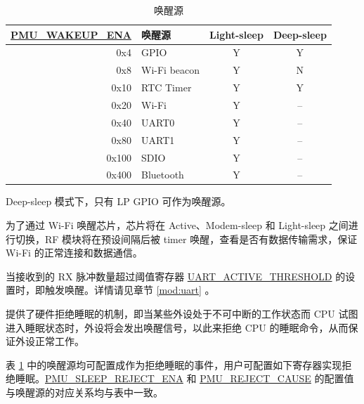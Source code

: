 \documentclass[main\_\_CN.tex]{subfiles}
\begin{document}
\begin{table}[H]
    \centering
    \caption{唤醒源}
    \label{tab:lowpowm-wakeup-source}
    \begin{threeparttable}
    \begin{tabular}{| r | l | c | c |}
    \hline
    \rowcolor{lightgray}
    \textbf{\hyperref[fielddesc:PMUWAKEUPENA]{PMU\_WAKEUP\_ENA}} & \textbf{唤醒源} &  \textbf{Light-sleep} & \textbf{Deep-sleep}  \\\hline
    0x4 & GPIO\tnote{1} & Y & Y \\\hline
    0x8 & Wi-Fi beacon  & Y & N \\\hline
    0x10 & RTC Timer  & Y & Y \\\hline
    0x20 & Wi-Fi\tnote{2} & Y & – \\\hline
    0x40 & UART0\tnote{3} & Y & – \\\hline
    0x80 & UART1\tnote{3} & Y & – \\\hline
    0x100 & SDIO & Y & – \\\hline
    0x400 & Bluetooth & Y & – \\\hline
    \end{tabular}
\begin{tablenotes}
    \item[1] Deep-sleep 模式下，只有 LP GPIO 可作为唤醒源。

    \item[2] 为了通过 Wi-Fi 唤醒芯片，芯片将在 Active、Modem-sleep 和 Light-sleep 之间进行切换，RF 模块将在预设间隔后被 timer 唤醒，查看是否有数据传输需求，保证 Wi-Fi 的正常连接和数据通信。

    \item[3] 当接收到的 RX 脉冲数量超过阈值寄存器 \hyperref[fielddesc:UARTACTIVETHRESHOLD]{UART\_ACTIVE\_THRESHOLD} 的设置时，即触发唤醒。详情请见章节 \ref{mod:uart} \textit{}。

    \end{tablenotes}
    \end{threeparttable}
\end{table}

\chipname{} 提供了硬件拒绝睡眠的机制，即当某些外设处于不可中断的工作状态而 CPU 试图进入睡眠状态时，外设将会发出唤醒信号，以此来拒绝 CPU 的睡眠命令，从而保证外设正常工作。

表 \ref{tab:lowpowm-wakeup-source} 中的唤醒源均可配置成作为拒绝睡眠的事件，用户可配置如下寄存器实现拒绝睡眠。\hyperref[fielddesc:PMUSLEEPREJECTENA]{PMU\_SLEEP\_REJECT\_ENA} 和 \hyperref[fielddesc:PMUREJECTCAUSE]{PMU\_REJECT\_CAUSE} 的配置值与唤醒源的对应关系均与表中一致。
\end{document}
